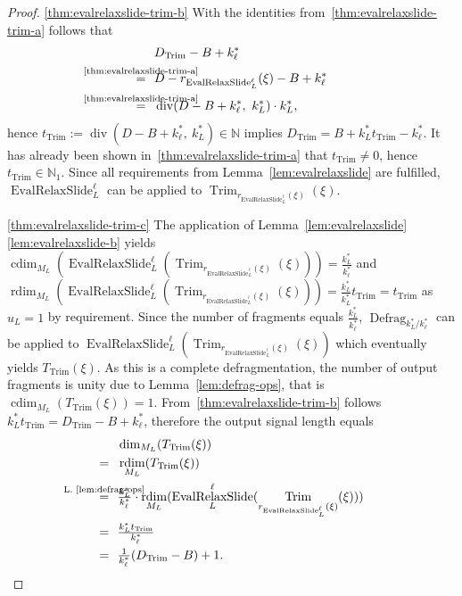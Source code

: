 \documentclass[journal]{IEEEtran}
\newcommand{\N}{\mathbb{N}}
\newcommand{\ROI}{B}
\DeclareMathOperator{\rdim}{rdim}
\DeclareMathOperator{\cdim}{cdim}
\DeclareMathOperator{\Defragmentation}{Defrag}
\DeclareMathOperator{\Trimming}{Trim}
\renewcommand{\div}[2]{\operatorname{div}(#1,\ #2)}
\newcommand{\equsing}[1]{\overset{\mathclap{\text{#1}}}{=}}
\DeclareMathOperator{\EvalRelaxSlide}{EvalRelaxSlide}
\begin{document}
\begin{proof}
\ref{thm:evalrelaxslide-trim-b}
With the identities from~\ref{thm:evalrelaxslide-trim-a} follows that
\begin{align*}
  & D_{\Trimming} - \ROI + k_\ell^*\\
  \equsing{\ref{thm:evalrelaxslide-trim-a}}\ \ & D - r_{\EvalRelaxSlide_L^\ell}(\xi) - \ROI + k_\ell^*\\
  \equsing{\ref{thm:evalrelaxslide-trim-a}}\ \ & \div{D - \ROI + k_\ell^*}{k_L^*}\cdot k_L^*\text{,}
\end{align*}
hence $t_{\Trimming} := \div{D - \ROI + k_\ell^*}{k_L^*}\in\N$ implies $D_{\Trimming} = \ROI + k_L^*t_{\Trimming} - k_\ell^*$.
It has already been shown in~\ref{thm:evalrelaxslide-trim-a} that $t_{\Trimming}\neq 0$, hence $t_{\Trimming}\in\N_1$.
Since all requirements from Lemma~\ref{lem:evalrelaxslide} are fulfilled, $\EvalRelaxSlide_L^\ell$ can be applied to $\Trimming_{r_{\EvalRelaxSlide_L^\ell}(\xi)}(\xi)$.

\ref{thm:evalrelaxslide-trim-c}
The application of Lemma~\ref{lem:evalrelaxslide}\ref{lem:evalrelaxslide-b} yields $\cdim_{M_L}( \EvalRelaxSlide_L^\ell( \Trimming_{r_{\EvalRelaxSlide_L^\ell}(\xi)}(\xi) ) ) = \frac{k_L^*}{k_\ell^*}$ and $\rdim_{M_L}( \EvalRelaxSlide_L^\ell( \Trimming_{r_{\EvalRelaxSlide_L^\ell}(\xi)}(\xi) ) ) = \frac{k_L^*}{k_L^*}t_{\Trimming} = t_{\Trimming}$ as $u_L = 1$ by requirement.
Since the number of fragments equals $\frac{k_L^*}{k_\ell^*}$, $\Defragmentation_{k_L^* / k_\ell^*}$ can be applied to $\EvalRelaxSlide_L^\ell( \Trimming_{r_{\EvalRelaxSlide_L^\ell}(\xi)}(\xi) )$ which eventually yields $T_{\Trimming}(\xi)$.
As this is a complete defragmentation, the number of output fragments is unity due to Lemma~\ref{lem:defrag-ops}, that is $\cdim_{M_L}( T_{\Trimming}(\xi) ) = 1$.
From~\ref{thm:evalrelaxslide-trim-b} follows $k_L^*t_{\Trimming} = D_{\Trimming} - \ROI + k_\ell^*$, therefore the output signal length equals
\begin{align*}
  & \dim_{M_L}( T_{\Trimming}(\xi) )\\
  =\ \ & \rdim_{M_L}( T_{\Trimming}(\xi) )\\
  \equsing{L.~\ref{lem:defrag-ops}}\ \ & \tfrac{k_L^*}{k_\ell^*}\cdot\rdim_{M_L}( \EvalRelaxSlide_L^\ell( \Trimming_{r_{\EvalRelaxSlide_L^\ell}(\xi)}(\xi) ) )\\
  =\ \ & \tfrac{k_L^*t_{\Trimming}}{k_\ell^*}\\
  =\ \ & \tfrac{1}{k_\ell^*}(D_{\Trimming} - \ROI) + 1\text{.}
\end{align*}


\end{proof}
\end{document}
